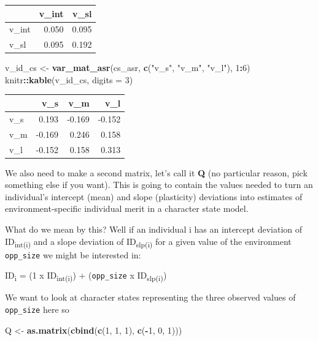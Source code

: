 \documentclass[
  12pt,
]{book}
\newenvironment{Shaded}{\begin{snugshade}}{\end{snugshade}}
\newcommand{\DataTypeTok}[1]{\textcolor[rgb]{0.13,0.29,0.53}{#1}}
\newcommand{\DecValTok}[1]{\textcolor[rgb]{0.00,0.00,0.81}{#1}}
\newcommand{\KeywordTok}[1]{\textcolor[rgb]{0.13,0.29,0.53}{\textbf{#1}}}
\newcommand{\NormalTok}[1]{#1}
\newcommand{\OperatorTok}[1]{\textcolor[rgb]{0.81,0.36,0.00}{\textbf{#1}}}
\newcommand{\StringTok}[1]{\textcolor[rgb]{0.31,0.60,0.02}{#1}}
\begin{document}
\begin{tabular}{l|r|r}
\hline
  & v\_int & v\_sl\\
\hline
v\_int & 0.050 & 0.095\\
\hline
v\_sl & 0.095 & 0.192\\
\hline
\end{tabular}

\begin{Shaded}
\begin{Highlighting}[]
\NormalTok{v\_id\_cs \textless{}{-}}\StringTok{ }\KeywordTok{var\_mat\_asr}\NormalTok{(cs\_asr, }\KeywordTok{c}\NormalTok{(}\StringTok{"v\_s"}\NormalTok{, }\StringTok{"v\_m"}\NormalTok{, }\StringTok{"v\_l"}\NormalTok{), }\DecValTok{1}\OperatorTok{:}\DecValTok{6}\NormalTok{)}
\NormalTok{knitr}\OperatorTok{::}\KeywordTok{kable}\NormalTok{(v\_id\_cs, }\DataTypeTok{digits =} \DecValTok{3}\NormalTok{)}
\end{Highlighting}
\end{Shaded}

\begin{tabular}{l|r|r|r}
\hline
  & v\_s & v\_m & v\_l\\
\hline
v\_s & 0.193 & -0.169 & -0.152\\
\hline
v\_m & -0.169 & 0.246 & 0.158\\
\hline
v\_l & -0.152 & 0.158 & 0.313\\
\hline
\end{tabular}

We also need to make a second matrix, let's call it \textbf{Q} (no particular reason, pick something else if you want). This is going to contain the values needed to turn an individual's intercept (mean) and slope (plasticity) deviations into estimates of environment-specific individual merit in a character state model.

What do we mean by this? Well if an individual i has an intercept deviation of ID\textsubscript{int(i)} and a slope deviation of ID\textsubscript{slp(i)} for a given value of the environment \texttt{opp\_size} we might be interested in:

ID\textsubscript{i} = (1 x ID\textsubscript{int(i)}) + (\texttt{opp\_size} x ID\textsubscript{slp(i)})

We want to look at character states representing the three observed values of \texttt{opp\_size} here so

\begin{Shaded}
\begin{Highlighting}[]
\NormalTok{Q \textless{}{-}}\StringTok{ }\KeywordTok{as.matrix}\NormalTok{(}\KeywordTok{cbind}\NormalTok{(}\KeywordTok{c}\NormalTok{(}\DecValTok{1}\NormalTok{, }\DecValTok{1}\NormalTok{, }\DecValTok{1}\NormalTok{),}
                    \KeywordTok{c}\NormalTok{(}\OperatorTok{{-}}\DecValTok{1}\NormalTok{, }\DecValTok{0}\NormalTok{, }\DecValTok{1}\NormalTok{)))}
\end{Highlighting}
\end{Shaded}
\end{document}
